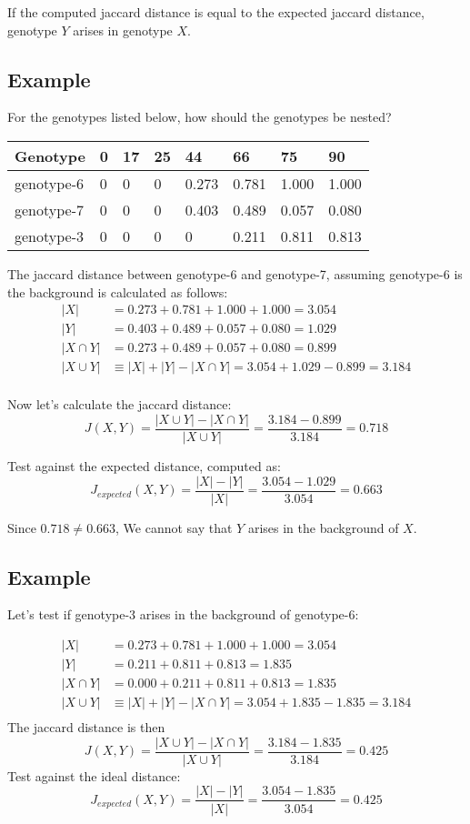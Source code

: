 \documentclass{book}
\begin{document}
If the computed jaccard distance is equal to the expected jaccard distance, genotype $Y$ arises in genotype $X$.

\subsection{Example}

  For the genotypes listed below, how should the genotypes be nested?

\begin{tabular}{l|lllllll}
  Genotype & 0 & 17 & 25 & 44 & 66 & 75 & 90 \\
  \hline
 genotype-6 & 0 & 0  & 0  & 0.273 & 0.781 & 1.000 & 1.000 \\
 genotype-7 & 0 & 0  & 0  & 0.403 & 0.489 & 0.057 & 0.080 \\
 genotype-3 & 0 & 0  & 0  & 0     & 0.211 & 0.811 & 0.813 \\
\end{tabular}


The jaccard distance between genotype-6 and genotype-7, assuming genotype-6 is the background is calculated as follows:
\newline
\begin{align*}
 |X| &= 0.273+0.781+1.000+1.000 = 3.054 \\
 |Y| &= 0.403+0.489+0.057+0.080=1.029 \\
 |X \cap Y|&=0.273+0.489+0.057+0.080=0.899 \\
 |X \cup Y| &\equiv |X|+|Y|-|X \cap Y|= 3.054+1.029-0.899=3.184 \\
\end{align*}
\newline

Now let's calculate the jaccard distance:
\[
J(X,Y)=\frac{|X\cup Y|-|X \cap Y|}{|X \cup Y|}=\frac{3.184-0.899}{3.184}=0.718
\]

Test against the expected distance, computed as:
\[
J_{expected}(X,Y) = \frac{|X|-|Y|}{|X|}=\frac{3.054-1.029}{3.054}=0.663
\]

Since $0.718\ne 0.663$, We cannot say that $Y$ arises in the background of $X$.

\subsection{Example}
Let's test if genotype-3 arises in the background of genotype-6:

\begin{align*}
|X| &= 0.273+0.781+1.000+1.000 = 3.054 \\
|Y| &= 0.211+0.811+0.813=1.835 \\
|X \cap Y|&=0.000+0.211+0.811+0.813=1.835 \\
|X \cup Y| &\equiv |X|+|Y|-|X \cap Y|= 3.054+1.835-1.835=3.184 \\
\end{align*}
The jaccard distance is then
\[
J(X,Y)=\frac{|X\cup Y|-|X \cap Y|}{|X \cup Y|}=\frac{3.184-1.835}{3.184}=0.425
\]
Test against the ideal distance:
\[
J_{expected}(X,Y) = \frac{|X|-|Y|}{|X|}=\frac{3.054-1.835}{3.054}=0.425
\]
\end{document}
